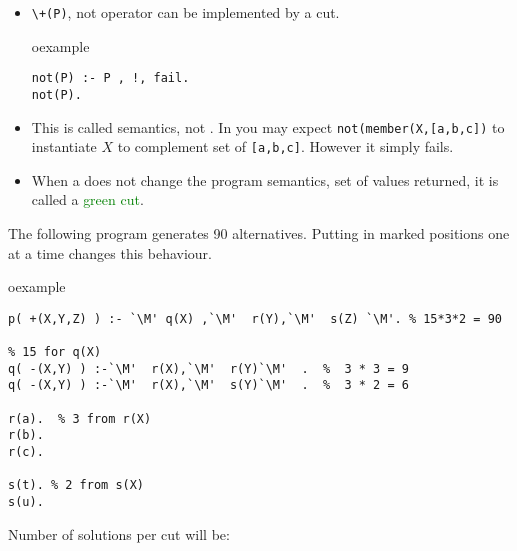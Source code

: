 \begin{frame}[fragile]
\begin{itemize}
\item \lstinline!\+(P)!, not operator can be implemented by a cut.\\
\begin{beamercolorbox}{oexample}
\begin{lstlisting}[escapeinside=`']
not(P) :- P , !, fail.
not(P).
\end{lstlisting}
\end{beamercolorbox}
\item This is called  semantics, not . In  you may expect \lstinline!not(member(X,[a,b,c])! to instantiate $X$ to complement set of \lstinline![a,b,c]!. However it simply fails.
\item When a  does not change the program semantics, set of values returned, it is called a \textcolor{green}{green cut}.
\end{itemize}
\end{frame}

\begin{frame}[fragile]
\def\M{\textcolor{gray}{ $\bigcirc$}}
The following program generates 90 alternatives. Putting  in marked
positions one at a time changes this behaviour.
\begin{beamercolorbox}{oexample}
\begin{lstlisting}[escapeinside=`']
p( +(X,Y,Z) ) :- `\M' q(X) ,`\M'  r(Y),`\M'  s(Z) `\M'. % 15*3*2 = 90

% 15 for q(X)
q( -(X,Y) ) :-`\M'  r(X),`\M'  r(Y)`\M'  .  %  3 * 3 = 9
q( -(X,Y) ) :-`\M'  r(X),`\M'  s(Y)`\M'  .  %  3 * 2 = 6

r(a).  % 3 from r(X)
r(b).
r(c).

s(t). % 2 from s(X)
s(u).
\end{lstlisting}
\end{beamercolorbox}

\noindent
Number of solutions per cut will be:\\
\end{frame}


